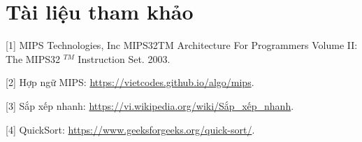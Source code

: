 \documentclass[a4paper]{article}
\begin{document}
\section*{Tài liệu tham khảo}
[1] MIPS Technologies, Inc MIPS32TM Architecture For Programmers Volume II: The MIPS32 ${ }^{T M}$ Instruction Set. 2003.

[2] Hợp ngữ MIPS: \href{https://vietcodes.github.io/algo/mips}{https://vietcodes.github.io/algo/mips}.

[3] Sắp xếp nhanh: \href{https://vi.wikipedia.org/wiki/S%E1%BA%AFp_x%E1%BA%BFp_nhanh}{https://vi.wikipedia.org/wiki/Sắp\_xếp\_nhanh}.

[4] QuickSort: \href{https://www.geeksforgeeks.org/quick-sort/}{https://www.geeksforgeeks.org/quick-sort/}.
\end{document}
